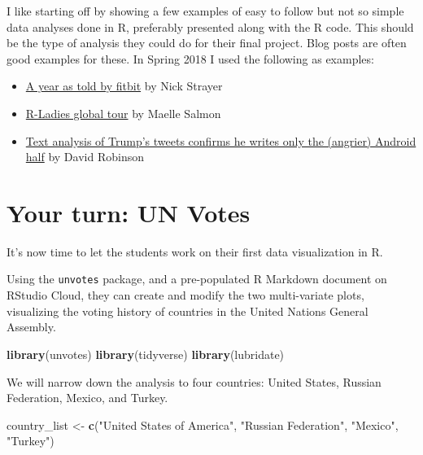 \documentclass[]{book}
\newenvironment{Shaded}{\begin{snugshade}}{\end{snugshade}}
\newcommand{\KeywordTok}[1]{\textcolor[rgb]{0.13,0.29,0.53}{\textbf{#1}}}
\newcommand{\StringTok}[1]{\textcolor[rgb]{0.31,0.60,0.02}{#1}}
\newcommand{\NormalTok}[1]{#1}
\providecommand{\tightlist}{%
  \setlength{\itemsep}{0pt}\setlength{\parskip}{0pt}}
\theoremstyle{definition}
\theoremstyle{definition}
\theoremstyle{definition}
\theoremstyle{remark}
\begin{document}
I like starting off by showing a few examples of easy to follow but not
so simple data analyses done in R, preferably presented along with the R
code. This should be the type of analysis they could do for their final
project. Blog posts are often good examples for these. In Spring 2018 I
used the following as examples:

\begin{itemize}
\tightlist
\item
  \href{http://livefreeordichotomize.com/2017/12/27/a-year-as-told-by-fitbit/}{A
  year as told by fitbit} by Nick Strayer
\item
  \href{http://www.masalmon.eu/2017/10/06/globalrladiestour/}{R-Ladies
  global tour} by Maelle Salmon
\item
  \href{http://varianceexplained.org/r/trump-tweets/}{Text analysis of
  Trump's tweets confirms he writes only the (angrier) Android half} by
  David Robinson
\end{itemize}

\section{Your turn: UN Votes}\label{your-turn-un-votes}

It's now time to let the students work on their first data visualization
in R.

Using the \texttt{unvotes} package, and a pre-populated R Markdown
document on RStudio Cloud, they can create and modify the two
multi-variate plots, visualizing the voting history of countries in the
United Nations General Assembly.

\begin{Shaded}
\begin{Highlighting}[]
\KeywordTok{library}\NormalTok{(unvotes)}
\KeywordTok{library}\NormalTok{(tidyverse)}
\KeywordTok{library}\NormalTok{(lubridate)}
\end{Highlighting}
\end{Shaded}

We will narrow down the analysis to four countries: United States,
Russian Federation, Mexico, and Turkey.

\begin{Shaded}
\begin{Highlighting}[]
\NormalTok{country_list <-}\StringTok{ }\KeywordTok{c}\NormalTok{(}\StringTok{"United States of America"}\NormalTok{, }\StringTok{"Russian Federation"}\NormalTok{, }
                  \StringTok{"Mexico"}\NormalTok{, }\StringTok{"Turkey"}\NormalTok{)}
\end{Highlighting}
\end{Shaded}
\end{document}
